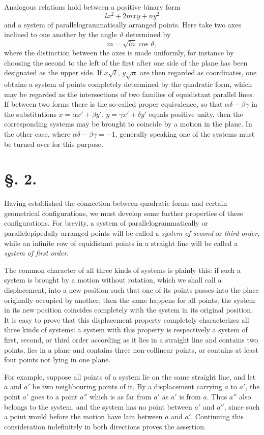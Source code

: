 \documentclass[11pt]{article}
\begin{document}
Analogous relations hold between a positive binary form
\[
 lx^2+2mxy+ny^2
\]
and a system of parallelogrammatically arranged points. Here take two axes inclined to one another by the angle $\vartheta$ determined by
\[
 m=\sqrt{ln}\cos\vartheta,
\]
where the distinction between the axes is made uniformly, for instance by choosing the second to the left of the first after one side of the plane has been designated as the upper side. If $x\sqrt l$, $y\sqrt n$ are then regarded as coordinates, one obtains a system of points completely determined by the quadratic form, which may be regarded as the intersections of two families of equidistant parallel lines. If between two forms there is the so-called proper equivalence, so that $\alpha\delta-\beta\gamma$ in the substitutions $x=\alpha x'+\beta y'$, $y=\gamma x'+\delta y'$ equals positive unity, then the corresponding systems may be brought to coincide by a motion in the plane. In the other case, where $\alpha\delta-\beta\gamma=-1$, generally speaking one of the systems must be turned over for this purpose.

\section*{§. 2.}

Having established the connection between quadratic forms and certain geometrical configurations, we must develop some further properties of these configurations. For brevity, a system of parallelogrammatically or parallelepipedally arranged points will be called a \emph{system of second} or \emph{third order}, while an infinite row of equidistant points in a straight line will be called a \emph{system of first order}.

The common character of all three kinds of systems is plainly this: if such a system is brought by a motion without rotation, which we shall call a displacement, into a new position such that one of its points passes into the place originally occupied by another, then the same happens for all points; the system in its new position coincides completely with the system in its original position. It is easy to prove that this displacement property completely characterizes all three kinds of systems: a system with this property is respectively a system of first, second, or third order according as it lies in a straight line and contains two points, lies in a plane and contains three non-collinear points, or contains at least four points not lying in one plane.

For example, suppose all points of a system lie on the same straight line, and let $a$ and $a'$ be two neighbouring points of it. By a displacement carrying $a$ to $a'$, the point $a'$ goes to a point $a''$ which is as far from $a'$ as $a'$ is from $a$. Thus $a''$ also belongs to the system, and the system has no point between $a'$ and $a''$, since such a point would before the motion have lain between $a$ and $a'$. Continuing this consideration indefinitely in both directions proves the assertion.
\end{document}
